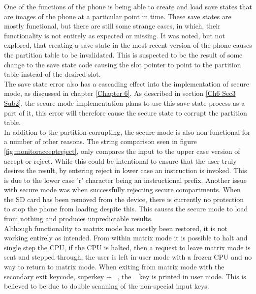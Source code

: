One of the functions of the phone is being able to create and load save states that are images of the phone at a particular point in time. These save states are mostly functional, but there are still some strange cases, in which, their functionality is not entirely as expected or missing. It was noted, but not explored, that creating a save state in the most recent version of the phone causes the partition table to be invalidated. This is suspected to be the result of some change to the save state code causing the slot pointer to point to the partition table instead of the desired slot.\\

The save state error also has a cascading effect into the implementation of secure mode, as discussed in chapter \ref{Chapter 6}. 
As described in section \ref{Ch6 Sec3 Sub2}, the secure mode implementation plans to use this save state process as a part of it, this error will therefore cause the secure state to corrupt the partition table.\\

In addition to the partition corrupting, the secure mode is also non-functional for a number of other reasons. 
The string comparison seen in figure \ref{fig:monitoracceptreject}, only compares the input to the upper case version of accept or reject. 
While this could be intentional to ensure that the user truly desires the result, by entering reject in lower case an instruction is invoked. 
This is due to the lower case 'r' character being an instructional prefix. 
Another issue with secure mode was when successfully rejecting secure compartments. When the SD card has been removed from the device, there is currently no protection to stop the phone from loading despite this.
This causes the secure mode to load from nothing and produces unpredictable results.\\

Although functionality to matrix mode has mostly been restored, it is not working entirely as intended. 
From within matrix mode it is possible to halt and single step the CPU, if the CPU is halted, then a request to leave matrix mode is sent and stepped through, the user is left in user mode with a frozen CPU and no way to return to matrix mode.
When exiting from matrix mode with the secondary exit keycode, superkey + ~, the ~ key is printed in user mode. 
This is believed to be due to double scanning of the non-special input keys.\\

